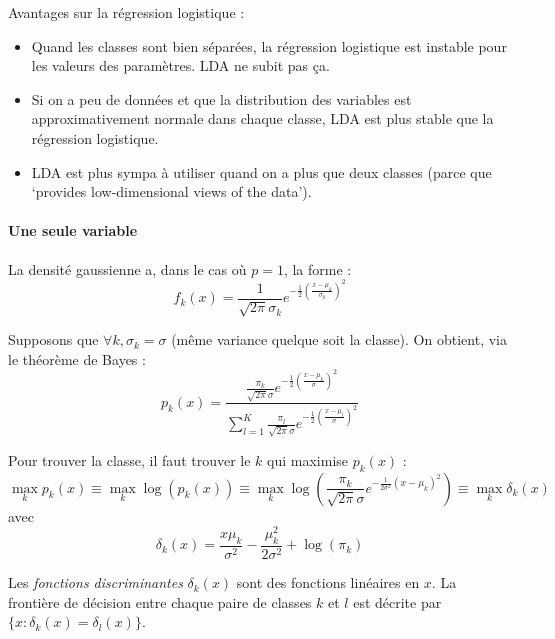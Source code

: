         Avantages sur la régression logistique :
        \begin{itemize}
            \item Quand les classes sont bien séparées, la régression logistique est instable pour les valeurs des paramètres. LDA ne subit pas ça.
            \item Si on a peu de données et que la distribution des variables est approximativement normale dans chaque classe, LDA est plus stable que la régression logistique.
            \item LDA est plus sympa à utiliser quand on a plus que deux classes (parce que `provides low-dimensional views of the data').
        \end{itemize}

        \paragraph{Une seule variable}
            La densité gaussienne a, dans le cas où \(p = 1\), la forme :
            \[
                f_k(x) = \frac{1}{\sqrt{2\pi}\sigma_k} e^{-\frac{1}{2}\left(\frac{x - \mu_k}{\sigma_k}\right)^2}
            \]
            
            Supposons que \(\forall k, \sigma_k = \sigma\) (même variance quelque soit la classe). On obtient, via le théorème de Bayes :
            \[
                p_k(x) = \frac{\frac{\pi_k}{\sqrt{2\pi}\sigma} e^{-\frac{1}{2}\left(\frac{x - \mu_k}{\sigma}\right)^2}}{\sum_{l=1}^K \frac{\pi_l}{\sqrt{2\pi}\sigma} e^{-\frac{1}{2}\left(\frac{x - \mu_l}{\sigma}\right)^2}}
            \]

            Pour trouver la classe, il faut trouver le \(k\) qui maximise \(p_k(x)\) :
            \[
                \max_k p_k(x) \equiv \max_k \log(p_k(x)) \equiv \max_k \log\left(\frac{\pi_k}{\sqrt{2\pi}\sigma} e^{-\frac{1}{2\sigma^2}(x - \mu_k)^2}\right) \equiv \max_k \delta_k(x)
            \]
            avec \[\delta_k(x) = \frac{x \mu_k}{\sigma^2} - \frac{\mu_k^2}{2\sigma^2} + \log(\pi_k)\]

            Les \textit{fonctions discriminantes} \(\delta_k(x)\) sont des fonctions linéaires en \(x\). La frontière de décision entre chaque paire de classes \(k\) et \(l\) est décrite par \(\{x : \delta_k(x) = \delta_l(x)\}\).

